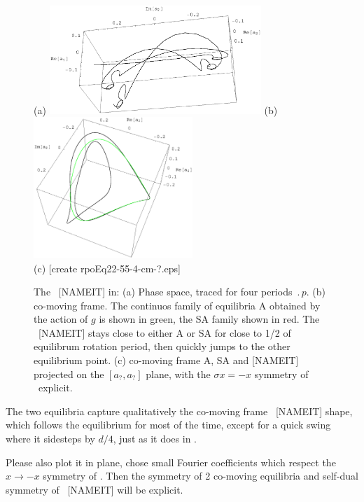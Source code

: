 \begin{figure}[t] %
\centering
(a) \includegraphics[width=8.0cm]{figs/rpo22-55-4.eps}
%
\hspace{0.1in}
(b) \includegraphics[width=6.0cm]{figs/rpoEq22-55-4-cm.eps}
\\
(c) [create rpoEq22-55-4-cm-?.eps]
\caption{
 The \rpo\ [NAMEIT] in: 
 (a) Phase space, traced for four periods $\period{p}$.
 (b) co-moving frame. 
        The continuos family of 
	equilibria A obtained by the action of $g$ is shown in green,
	the SA family shown in red. The \rpo\ [NAMEIT] stays close
	to either A or SA for close to 1/2 of equilibrum rotation
	period, then quickly jumps to the other equilibrium point.
 (c) co-moving frame A, SA and [NAMEIT] projected on the 
	$[a_?,a_?]$ plane,
	with the $\sigma x = -x$ symmetry of \KSe\ explicit.
        }
\label{f:rpoNAMEIT}
\end{figure}


The two equilibria
capture qualitatively the co-moving frame \rpo\ [NAMEIT] shape,
which follows the
equilibrium for most of the time, except for a quick swing where it
sidesteps by $d/4$, just as it does in . 

Please also plot it in plane, chose small Fourier coefficients
 which respect the $x \to -x$ symmetry of \KSe.
Then the symmetry of 2 co-moving
equilibria and self-dual symmetry of \rpo\ [NAMEIT] will be explicit.

